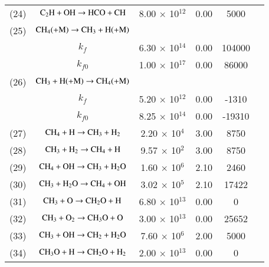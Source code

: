 \documentclass{warpdoc}
\begin{document}
\begin{table}[h]
\begin{center}
\begin{threeparttable}
\begin{tabular}{cccccc}
(24) & $\rm C_2 H + OH \rightarrow HCO + CH $ &8.00 $\times$ 10$^{12}$  & 0.00 &5000 &\cite{ef:2017:zettervall}\\

(25) & $\rm C H_4(+M) \rightarrow CH_3 + H(+M) $  &  &  &  & \cite{rkm:1991:smoke}\\

  & $k_f $ \tnote{c} & 6.30 $\times$ 10$^{14}$ &0.00  &104000  &\\

  & $k_{f0} $\tnote{c} & 1.00 $\times$ 10$^{17}$ & 0.00 & 86000 &\\
  
  (26) & $\rm CH_3 + H(+M)  \rightarrow C H_4(+M) $&  &  &  &\cite{rkm:1991:smoke}\\

  & $k_f $ & 5.20 $\times$ 10$^{12}$ &0.00  &-1310  &\\

  & $k_{f0} $ & 8.25 $\times$ 10$^{14}$ & 0.00 & -19310 &\\
  
(27) & $\rm C H_4 + H \rightarrow C H_3 + H_2 $ &2.20 $\times$ 10$^{4}$  & 3.00 &8750 &\cite{rkm:1991:smoke}\\  

(28) & $\rm C H_3 + H_2 \rightarrow C H_4 + H $ &9.57 $\times$ 10$^{2}$  & 3.00 &8750 &\cite{rkm:1991:smoke}\\ 

(29) & $\rm C H_4 + OH \rightarrow C H_3 + H_2 O $ &1.60 $\times$ 10$^{6}$  & 2.10 &2460 &\cite{rkm:1991:smoke}\\ 

(30) & $\rm C H_3 + H_2 O \rightarrow C H_4 + OH $ &3.02 $\times$ 10$^{5}$  & 2.10 &17422 &\cite{rkm:1991:smoke}\\ 

(31) & $\rm C H_3 + O \rightarrow C H_2 O + H $ &6.80 $\times$ 10$^{13}$  & 0.00 &0 &\cite{rkm:1991:smoke}\\ 

(32) & $\rm C H_3 + O_2 \rightarrow C H_3 O + O $ &3.00 $\times$ 10$^{13}$  & 0.00 &25652 &\cite{rkm:1991:smoke}\\ 

(33) & $\rm C H_3 + OH \rightarrow C H_2  + H_2 O $ &7.60 $\times$ 10$^{6}$  & 2.00 &5000 &\cite{comb:2010:glassman}\\

(34) & $\rm C H_3 O + H \rightarrow C H_2 O  + H_2 $ &2.00 $\times$ 10$^{13}$  & 0.00 &0 &\cite{rkm:1991:smoke}\\ 


\end{tabular}
\end{threeparttable}
\end{center}
\end{table}
\end{document}
